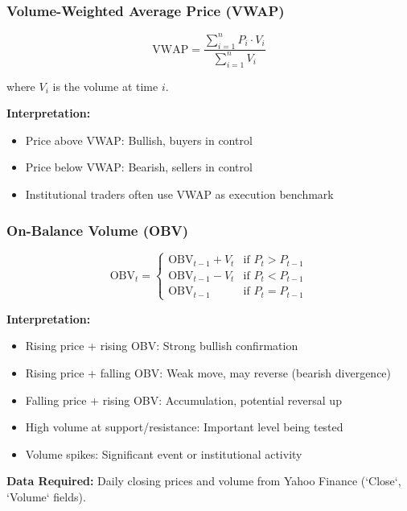 \documentclass[11pt,a4paper]{article}
\begin{document}
\subsubsection{Volume-Weighted Average Price (VWAP)}

\begin{equation}
\text{VWAP} = \frac{\sum_{i=1}^{n} P_i \cdot V_i}{\sum_{i=1}^{n} V_i}
\end{equation}

where $V_i$ is the volume at time $i$.

\textbf{Interpretation:}
\begin{itemize}
    \item Price above VWAP: Bullish, buyers in control
    \item Price below VWAP: Bearish, sellers in control
    \item Institutional traders often use VWAP as execution benchmark
\end{itemize}

\subsubsection{On-Balance Volume (OBV)}

\begin{equation}
\text{OBV}_t = \begin{cases}
\text{OBV}_{t-1} + V_t & \text{if } P_t > P_{t-1}\\
\text{OBV}_{t-1} - V_t & \text{if } P_t < P_{t-1}\\
\text{OBV}_{t-1} & \text{if } P_t = P_{t-1}
\end{cases}
\end{equation}

\textbf{Interpretation:}
\begin{itemize}
    \item Rising price + rising OBV: Strong bullish confirmation
    \item Rising price + falling OBV: Weak move, may reverse (bearish divergence)
    \item Falling price + rising OBV: Accumulation, potential reversal up
    \item High volume at support/resistance: Important level being tested
    \item Volume spikes: Significant event or institutional activity
\end{itemize}

\textbf{Data Required:} Daily closing prices and volume from Yahoo Finance (`Close`, `Volume` fields).
\end{document}
